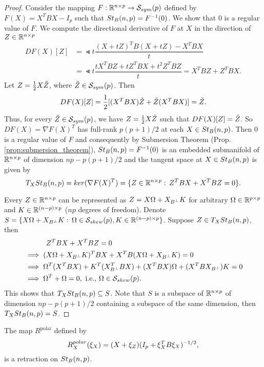 \documentclass[11pt,a4paper]{article}
\begin{document}
\begin{proof}
Consider the mapping $F:\mathbb{R}^{n\times p}\rightarrow \mathcal{S}_{sym}(p)$ defined by $F(X) = X^TBX - I_p$ such that $St_B(n,p) = F^{-1}(0)$. We show that $0$ is a regular value of $F$. We compute the directional derivative of $F$ at $X$ in the direction of $Z\in\mathbb{R}^{n\times p}$
\begin{align*}
DF(X)[Z] &= \Lt{t} \dfrac{(X+tZ)^TB(X+tZ)-X^TBX}{t} \\
&= \Lt{t} \dfrac{tX^TBZ+tZ^TBX + t^2Z^TBZ}{t} = X^TBZ+Z^TBX.
\end{align*}
Let $Z = \frac{1}{2}X\Tilde{Z}$, where $\Tilde{Z}\in \mathcal{S}_{sym}(p)$. Then 
\begin{equation*}
DF(X)[Z] = \frac{1}{2}[(X^TBX)\Tilde{Z} + \Tilde{Z}(X^TBX)] = \Tilde{Z}.
\end{equation*}
Thus, for every $\Tilde{Z}\in\mathcal{S}_{sym}(p)$, we have $Z = \frac{1}{2}X\Tilde{Z}$ such that $DF(X)[Z] = \Tilde{Z}$. So $DF(X) = \nabla F(X)^T$ has full-rank $p(p+1)/2$ at each $X\in St_B(n,p)$. Then $0$ is a regular value of $F$ and consequently by Submersion Theorem (Prop. \ref{prop:submersion_theorem}), $St_B(n,p) = F^{-1}(0)$ is an embedded submanifold of $\mathbb{R}^{n\times p}$ of dimension $np-p(p+1)/2$ and the tangent space at $X\in St_B(n,p)$ is given by
\begin{equation*}
T_XSt_B(n,p) = ker(\nabla F(X)^T) = \{Z\in\mathbb{R}^{n\times p}:\,Z^TBX + X^TBZ = 0\}.
\end{equation*}

Every $Z\in\mathbb{R}^{n\times p}$ can be represented as $Z = X\Omega+X_{B^\perp} K$ for arbitrary $\Omega\in\mathbb{R}^{p\times p}$ and $K\in\mathbb{R}^{(n-p)\times p}$ ($np$ degrees of freedom). Denote $S = \{X\Omega + X_{B^\perp} K:\, \Omega \in \mathcal{S}_{skew}(p),K\in\mathbb{R}^{(n-p)\times p}\}$. Suppose $Z\in T_XSt_B(n,p)$, then 
\begin{align*}
&\;\hspace{1cm} Z^TBX + X^TBZ = 0 \\
&\implies (X\Omega+X_{B^\perp} K)^TBX + X^TB(X\Omega+X_{B^\perp} K) = 0 \\
&\implies \Omega^T(X^TBX) + K^T(X_{B^\perp}^TBX) + (X^TBX)\Omega + (X^TBX_{B^\perp}) K = 0 \\
&\implies \Omega^T + \Omega = 0, \text{ i.e., }\Omega\in\mathcal{S}_{skew}(p).
\end{align*}
This shows that $T_XSt_B(n,p)\subseteq S$. Note that $S$ is a subspace of $\mathbb{R}^{n\times p}$ of dimension $np-p(p+1)/2$ containing a subspace of the same dimension, then $T_XSt_B(n,p) = S$.
\end{proof}

\begin{proposition}
The map $R^{\text{polar}}$ defined by 
\begin{equation}
R^{polar}_X(\xi_X) = (X+\xi_Z)(I_p + \xi_X^TB\xi_X)^{-1/2},
\end{equation}
is a retraction on $St_B(n,p)$.
\end{proposition}
\end{document}
